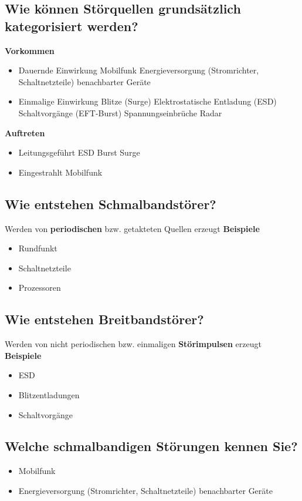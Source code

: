 \subsection{Wie können Störquellen grundsätzlich kategorisiert werden?}
\textbf{Vorkommen}
\begin{itemize}
  \item Dauernde Einwirkung
  \subitem Mobilfunk
  \subitem Energieversorgung (Stromrichter, Schaltnetzteile) benachbarter Geräte
  \item Einmalige Einwirkung
  \subitem Blitze (Surge)
  \subitem Elektrostatische Entladung (ESD)
  \subitem Schaltvorgänge (EFT-Burst)
  \subitem Spannungseinbrüche
  \subitem Radar
\end{itemize}
%
\textbf{Auftreten}
\begin{itemize}
  \item Leitungsgeführt
  \subitem ESD
  \subitem Burst
  \subitem Surge

  \item Eingestrahlt
  \subitem Mobilfunk
\end{itemize}

\subsection{Wie entstehen Schmalbandstörer?}
Werden von \textbf{periodischen} bzw. getakteten Quellen erzeugt
\textbf{Beispiele}
\begin{itemize}
  \item Rundfunkt
  \item Schaltnetzteile
  \item Prozessoren
\end{itemize}

\subsection{Wie entstehen Breitbandstörer?}
Werden von nicht periodischen bzw. einmaligen \textbf{Störimpulsen} erzeugt
\textbf{Beispiele}
\begin{itemize}
  \item ESD
  \item Blitzentladungen
  \item Schaltvorgänge
\end{itemize}

\subsection{Welche schmalbandigen Störungen kennen Sie?}
\begin{itemize}
  \item Mobilfunk
  \item Energieversorgung (Stromrichter, Schaltnetzteile) benachbarter Geräte
\end{itemize}

